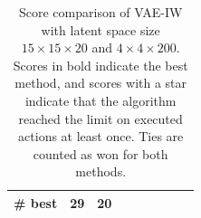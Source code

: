 \begin{table}[ht]
\begin{center}
\begin{small}
\begin{tabular}{lrrrrrrrl}
\# best & 29 & 20  \\

\bottomrule

\end{tabular}
\end{small}
\end{center}
\caption{Score comparison of VAE-IW with latent space size $15\times15\times20$ and $4\times4\times 200$. Scores in bold indicate the best method, and scores with a star indicate that the algorithm reached the limit on executed actions at least once. Ties are counted as won for both methods.} 
\label{tab:atari-model-comp}
\end{table}